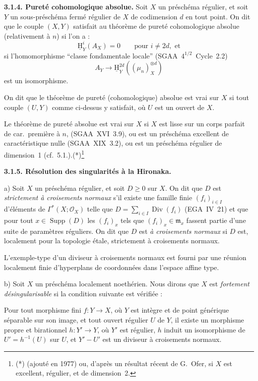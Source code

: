\documentclass[11pt]{article}
\DeclareMathOperator{\Supp}{Supp}
\DeclareMathOperator{\Div}{Div}
\providecommand{\cO}{\mathcal{O}}
\providecommand{\fm}{\mathfrak{m}}
\renewcommand{\H}{\mathrm{H}}
\providecommand{\Supp}{\operatorname{Supp}}
\providecommand{\fm}{\mathfrak m}
\begin{document}
\textbf{3.1.4. Pureté cohomologique absolue.} Soit $X$ un préschéma régulier, et soit $Y$ un sous-préschéma fermé régulier de $X$ de codimension $d$ en tout point. On dit que le couple $(X,Y)$ satisfait au théorème de pureté cohomologique absolue (relativement à $n$) si l'on a :
\[
\underline{\H}^i_Y(A_X) = 0 \qquad \text{pour } i \neq 2d, \text{ et}
\]
si l'homomorphisme ``classe fondamentale locale'' (SGAA~$4^{1/2}$~Cycle~2.2)
\[
A_Y \longrightarrow \underline{\H}^{2d}_Y((\mu_n)^{\otimes d}_X)
\]
est un isomorphisme.

On dit que le théorème de pureté (cohomologique) absolue est vrai sur $X$ si tout couple $(U,Y)$ comme ci-dessus y satisfait, où $U$ est un ouvert de $X$.

Le théorème de pureté absolue est vrai sur $X$ si $X$ est lisse sur un corps parfait de car.~première à $n$, (SGAA~XVI~3.9), ou est un préschéma excellent de caractéristique nulle (SGAA~XIX~3.2), ou est un préschéma régulier de dimension~1 (cf.~5.1.).(*)\footnote{(*) (ajouté en 1977) ou, d'après un résultat récent de G.~Ofer, si $X$ est excellent, régulier, et de dimension~2.}

\textbf{3.1.5. Résolution des singularités à la Hironaka.}

a) Soit $X$ un préschéma régulier, et soit $D \geqslant 0$ sur $X$. On dit que $D$ est \emph{strictement à croisements normaux} s'il existe une famille finie $(f_i)_{i \in I}$ d'éléments de $\Gamma^{*}(X; \cO_X)$ telle que $D = \sum_{i \in I} \Div(f_i)$ (EGA~IV~21) et que pour tout $x \in \Supp(D)$ les $(f_i)_x$ tels que $(f_i)_x \in \fm_x$ fassent partie d'une suite de paramètres réguliers. On dit que $D$ est \emph{à croisements normaux} si $D$ est, localement pour la topologie étale, strictement à croisements normaux.

L'exemple-type d'un diviseur à croisements normaux est fourni par une réunion localement finie d'hyperplans de coordonnées dans l'espace affine type.

b) Soit $X$ un préschéma localement noethérien. Nous dirons que $X$ est \emph{fortement désingularisable} si la condition suivante est vérifiée :

Pour tout morphisme fini $f : Y \to X$, où $Y$ est intègre et de point générique séparable sur son image, et tout ouvert régulier $U$ de $Y$, il existe un morphisme propre et birationnel $h : Y' \to Y$, où $Y'$ est régulier, $h$ induit un isomorphisme de $U' = h^{-1}(U)$ sur $U$, et $Y' - U'$ est un diviseur à croisements normaux.
\end{document}
